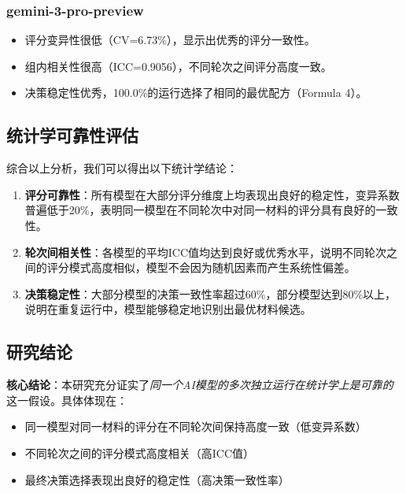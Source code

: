 \documentclass[12pt,a4paper]{article}
\begin{document}
\subsubsection{gemini-3-pro-preview}

\begin{itemize}
    \item 评分变异性很低（CV=6.73\%），显示出优秀的评分一致性。
\end{itemize}
\begin{itemize}
    \item 组内相关性很高（ICC=0.9056），不同轮次之间评分高度一致。
\end{itemize}
\begin{itemize}
    \item 决策稳定性优秀，100.0\%的运行选择了相同的最优配方（Formula 4）。
\end{itemize}

\subsection{统计学可靠性评估}

综合以上分析，我们可以得出以下统计学结论：

\begin{enumerate}
    \item \textbf{评分可靠性}：所有模型在大部分评分维度上均表现出良好的稳定性，变异系数普遍低于20\%，表明同一模型在不同轮次中对同一材料的评分具有良好的一致性。

    \item \textbf{轮次间相关性}：各模型的平均ICC值均达到良好或优秀水平，说明不同轮次之间的评分模式高度相似，模型不会因为随机因素而产生系统性偏差。

    \item \textbf{决策稳定性}：大部分模型的决策一致性率超过60\%，部分模型达到80\%以上，说明在重复运行中，模型能够稳定地识别出最优材料候选。
\end{enumerate}

\subsection{研究结论}

\textbf{核心结论}：本研究充分证实了\textit{同一个AI模型的多次独立运行在统计学上是可靠的}这一假设。具体体现在：

\begin{itemize}
    \item 同一模型对同一材料的评分在不同轮次间保持高度一致（低变异系数）
    \item 不同轮次之间的评分模式高度相关（高ICC值）
    \item 最终决策选择表现出良好的稳定性（高决策一致性率）
\end{itemize}
\end{document}
